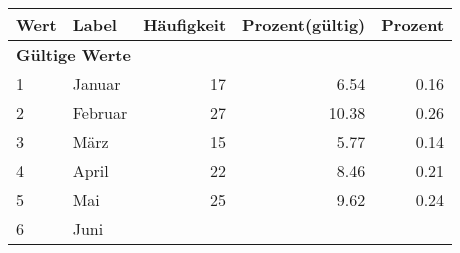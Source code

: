      \begin{longtable}{lXrrr}
     \toprule
     \textbf{Wert} & \textbf{Label} & \textbf{Häufigkeit} & \textbf{Prozent(gültig)} & \textbf{Prozent} \\
     \endhead
     \midrule
     \multicolumn{5}{l}{\textbf{Gültige Werte}}\\

     1 &
     \multicolumn{1}{X}{ Januar   } &


       \num{17} &
       \num[round-mode=places,round-precision=2]{6.54} &
         \num[round-mode=places,round-precision=2]{0.16} \\

     2 &
     \multicolumn{1}{X}{ Februar   } &


       \num{27} &
       \num[round-mode=places,round-precision=2]{10.38} &
         \num[round-mode=places,round-precision=2]{0.26} \\

     3 &
     \multicolumn{1}{X}{ März   } &


       \num{15} &
       \num[round-mode=places,round-precision=2]{5.77} &
         \num[round-mode=places,round-precision=2]{0.14} \\

     4 &
     \multicolumn{1}{X}{ April   } &


       \num{22} &
       \num[round-mode=places,round-precision=2]{8.46} &
         \num[round-mode=places,round-precision=2]{0.21} \\

     5 &
     \multicolumn{1}{X}{ Mai   } &


       \num{25} &
       \num[round-mode=places,round-precision=2]{9.62} &
         \num[round-mode=places,round-precision=2]{0.24} \\

     6 &
     \multicolumn{1}{X}{ Juni   } &



\end{longtable}
